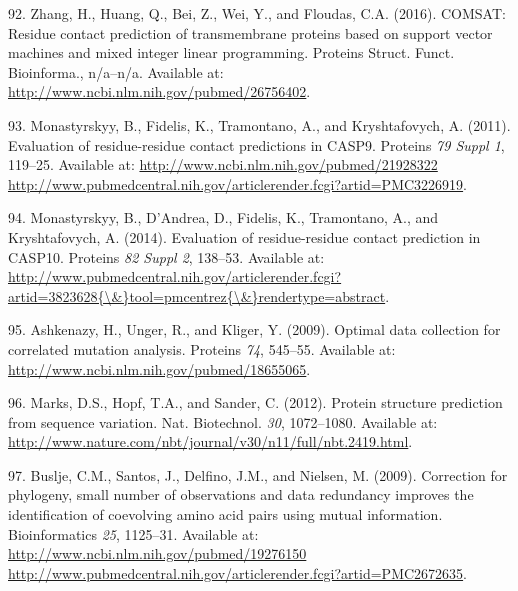 \documentclass[12pt,a4paper,twoside]{book}
\theoremstyle{definition}
\theoremstyle{definition}
\theoremstyle{remark}
\begin{document}
\hypertarget{ref-Zhang2016}{}
92. Zhang, H., Huang, Q., Bei, Z., Wei, Y., and Floudas, C.A. (2016).
COMSAT: Residue contact prediction of transmembrane proteins based on
support vector machines and mixed integer linear programming. Proteins
Struct. Funct. Bioinforma., n/a--n/a. Available at:
\url{http://www.ncbi.nlm.nih.gov/pubmed/26756402}.

\hypertarget{ref-Monastyrskyy2011}{}
93. Monastyrskyy, B., Fidelis, K., Tramontano, A., and Kryshtafovych, A.
(2011). Evaluation of residue-residue contact predictions in CASP9.
Proteins \emph{79 Suppl 1}, 119--25. Available at:
\href{http://www.ncbi.nlm.nih.gov/pubmed/21928322\%20http://www.pubmedcentral.nih.gov/articlerender.fcgi?artid=PMC3226919}{http://www.ncbi.nlm.nih.gov/pubmed/21928322 http://www.pubmedcentral.nih.gov/articlerender.fcgi?artid=PMC3226919}.

\hypertarget{ref-Monastyrskyy2014a}{}
94. Monastyrskyy, B., D'Andrea, D., Fidelis, K., Tramontano, A., and
Kryshtafovych, A. (2014). Evaluation of residue-residue contact
prediction in CASP10. Proteins \emph{82 Suppl 2}, 138--53. Available at:
\href{http://www.pubmedcentral.nih.gov/articlerender.fcgi?artid=3823628\%7B/\&\%7Dtool=pmcentrez\%7B/\&\%7Drendertype=abstract}{http://www.pubmedcentral.nih.gov/articlerender.fcgi?artid=3823628\{\textbackslash{}\&\}tool=pmcentrez\{\textbackslash{}\&\}rendertype=abstract}.

\hypertarget{ref-Ashkenazy2009}{}
95. Ashkenazy, H., Unger, R., and Kliger, Y. (2009). Optimal data
collection for correlated mutation analysis. Proteins \emph{74},
545--55. Available at:
\url{http://www.ncbi.nlm.nih.gov/pubmed/18655065}.

\hypertarget{ref-Marks2012}{}
96. Marks, D.S., Hopf, T.A., and Sander, C. (2012). Protein structure
prediction from sequence variation. Nat. Biotechnol. \emph{30},
1072--1080. Available at:
\url{http://www.nature.com/nbt/journal/v30/n11/full/nbt.2419.html}.

\hypertarget{ref-Buslje2009}{}
97. Buslje, C.M., Santos, J., Delfino, J.M., and Nielsen, M. (2009).
Correction for phylogeny, small number of observations and data
redundancy improves the identification of coevolving amino acid pairs
using mutual information. Bioinformatics \emph{25}, 1125--31. Available
at:
\href{http://www.ncbi.nlm.nih.gov/pubmed/19276150\%20http://www.pubmedcentral.nih.gov/articlerender.fcgi?artid=PMC2672635}{http://www.ncbi.nlm.nih.gov/pubmed/19276150 http://www.pubmedcentral.nih.gov/articlerender.fcgi?artid=PMC2672635}.
\end{document}
